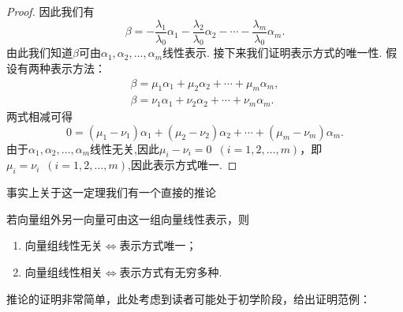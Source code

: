\begin{enumerate}
\begin{proof}
              因此我们有
              \[\beta=-\frac{\lambda_1}{\lambda_0}\alpha_1-\frac{\lambda_2}{\lambda_0}\alpha_2-\cdots-\frac{\lambda_m}{\lambda_0}\alpha_m.\]
              由此我们知道$\beta$可由$\alpha_1,\alpha_2,\ldots,\alpha_m$线性表示. 接下来我们证明表示方式的唯一性. 假设有两种表示方法：
              \begin{gather*}
                  \beta=\mu_1\alpha_1+\mu_2\alpha_2+\cdots+\mu_m\alpha_m, \\
                  \beta=\nu_1\alpha_1+\nu_2\alpha_2+\cdots+\nu_m\alpha_m.
              \end{gather*}
              两式相减可得
              \[0=(\mu_1-\nu_1)\alpha_1+(\mu_2-\nu_2)\alpha_2+\cdots+(\mu_m-\nu_m)\alpha_m.\]
              由于$\alpha_1,\alpha_2,\ldots,\alpha_m$线性无关,因此$\mu_i-\nu_i=0\enspace(i=1,2,\ldots,m)$，即$\mu_i=\nu_i\enspace(i=1,2,\ldots,m)$,因此表示方式唯一.
          \end{proof}

          事实上关于这一定理我们有一个直接的推论
          \begin{corollary}{}{}
              若向量组外另一向量可由这一组向量线性表示，则
              \begin{enumerate}
                  \item \label{item:3:线性无关等价表示唯一:1}
                        向量组线性无关$\iff$表示方式唯一；

                  \item \label{item:3:线性无关等价表示唯一:2}
                        向量组线性相关$\iff$表示方式有无穷多种.
              \end{enumerate}
          \end{corollary}
          推论的证明非常简单，此处考虑到读者可能处于初学阶段，给出证明范例：


\end{enumerate}
